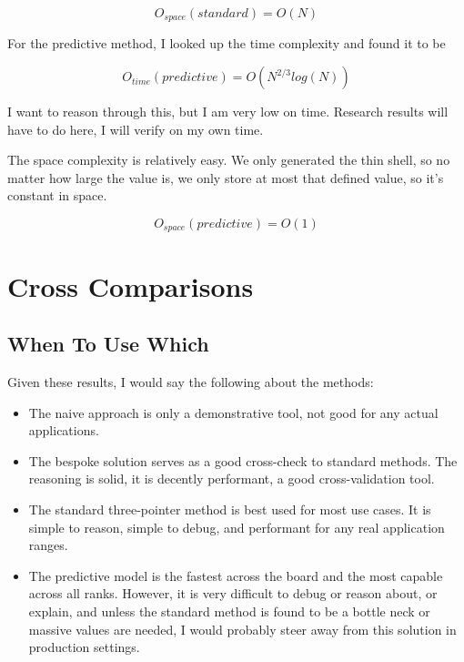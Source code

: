 \documentclass{article}
\begin{document}
\begin{equation}
    O_{space}(standard) = O(N)
\end{equation}

For the predictive method, I looked up the time complexity and found it to be

\begin{equation}
    O_{time}(predictive) = O(N^{2/3} log(N))
\end{equation}

I want to reason through this, but I am very low on time. Research results will have to do here, I will verify on my own time. \newline

The space complexity is relatively easy. We only generated the thin shell, so no matter how large the value is, we only store at most that defined value, so it's constant in space.

\begin{equation}
    O_{space}(predictive) = O(1)
\end{equation}

\newpage

\section{Cross Comparisons}

\subsection{When To Use Which}

Given these results, I would say the following about the methods:

\begin{itemize}
    \item The naive approach is only a demonstrative tool, not good for any actual applications.
    \item The bespoke solution serves as a good cross-check to standard methods. The reasoning is solid, it is decently performant, a good cross-validation tool.
    \item The standard three-pointer method is best used for most use cases. It is simple to reason, simple to debug, and performant for any real application ranges.
    \item The predictive model is the fastest across the board and the most capable across all ranks. However, it is very difficult to debug or reason about, or explain, and unless the standard method is found to be a bottle neck or massive values are needed, I would probably steer away from this solution in production settings.
\end{itemize}
\end{document}
